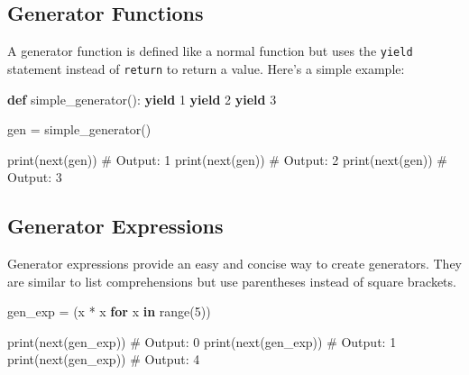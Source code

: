 \documentclass[
  letterpaper,
  DIV=11,
  numbers=noendperiod]{scrreprt}
\newenvironment{Shaded}{\begin{snugshade}}{\end{snugshade}}
\newcommand{\BuiltInTok}[1]{\textcolor[rgb]{0.00,0.23,0.31}{#1}}
\newcommand{\CommentTok}[1]{\textcolor[rgb]{0.37,0.37,0.37}{#1}}
\newcommand{\ControlFlowTok}[1]{\textcolor[rgb]{0.00,0.23,0.31}{\textbf{#1}}}
\newcommand{\DecValTok}[1]{\textcolor[rgb]{0.68,0.00,0.00}{#1}}
\newcommand{\KeywordTok}[1]{\textcolor[rgb]{0.00,0.23,0.31}{\textbf{#1}}}
\newcommand{\NormalTok}[1]{\textcolor[rgb]{0.00,0.23,0.31}{#1}}
\newcommand{\OperatorTok}[1]{\textcolor[rgb]{0.37,0.37,0.37}{#1}}
\begin{document}
\subsection{Generator Functions}\label{generator-functions}

A generator function is defined like a normal function but uses the
\texttt{yield} statement instead of \texttt{return} to return a value.
Here's a simple example:

\begin{Shaded}
\begin{Highlighting}[]
\KeywordTok{def}\NormalTok{ simple\_generator():}
    \ControlFlowTok{yield} \DecValTok{1}
    \ControlFlowTok{yield} \DecValTok{2}
    \ControlFlowTok{yield} \DecValTok{3}

\NormalTok{gen }\OperatorTok{=}\NormalTok{ simple\_generator()}

\BuiltInTok{print}\NormalTok{(}\BuiltInTok{next}\NormalTok{(gen))  }\CommentTok{\# Output: 1}
\BuiltInTok{print}\NormalTok{(}\BuiltInTok{next}\NormalTok{(gen))  }\CommentTok{\# Output: 2}
\BuiltInTok{print}\NormalTok{(}\BuiltInTok{next}\NormalTok{(gen))  }\CommentTok{\# Output: 3}
\end{Highlighting}
\end{Shaded}

\subsection{Generator Expressions}\label{generator-expressions-1}

Generator expressions provide an easy and concise way to create
generators. They are similar to list comprehensions but use parentheses
instead of square brackets.

\begin{Shaded}
\begin{Highlighting}[]
\NormalTok{gen\_exp }\OperatorTok{=}\NormalTok{ (x }\OperatorTok{*}\NormalTok{ x }\ControlFlowTok{for}\NormalTok{ x }\KeywordTok{in} \BuiltInTok{range}\NormalTok{(}\DecValTok{5}\NormalTok{))}

\BuiltInTok{print}\NormalTok{(}\BuiltInTok{next}\NormalTok{(gen\_exp))  }\CommentTok{\# Output: 0}
\BuiltInTok{print}\NormalTok{(}\BuiltInTok{next}\NormalTok{(gen\_exp))  }\CommentTok{\# Output: 1}
\BuiltInTok{print}\NormalTok{(}\BuiltInTok{next}\NormalTok{(gen\_exp))  }\CommentTok{\# Output: 4}
\end{Highlighting}
\end{Shaded}
\end{document}

